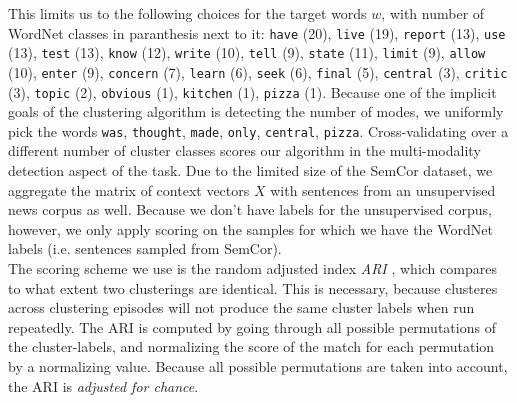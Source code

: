 \documentclass[a4paper,12pt,twoside,openright]{report}
\begin{document}
This limits us to the following choices for the target words $w$, with number of WordNet classes in paranthesis next to it: 
\Verb#have# (20), \Verb#live# (19), \Verb#report# (13), \Verb#use# (13), \Verb#test# (13), \Verb#know# (12), \Verb#write# (10), \Verb#tell# (9), \Verb#state# (11), \Verb#limit# (9), \Verb#allow# (10), \Verb#enter# (9), \Verb#concern# (7), \Verb#learn# (6), \Verb#seek# (6), \Verb#final# (5), \Verb#central# (3), \Verb#critic# (3), \Verb#topic# (2), \Verb#obvious# (1), \Verb#kitchen# (1), \Verb#pizza# (1).
Because one of the implicit goals of the clustering algorithm is detecting the number of modes, we uniformly pick the words \Verb#was#, \Verb#thought#, \Verb#made#, \Verb#only#, \Verb#central#, \Verb#pizza#.
Cross-validating over a different number of cluster classes scores our algorithm in the multi-modality detection aspect of the task.
Due to the limited size of the SemCor dataset, we aggregate the matrix of context vectors $X$ with sentences from an unsupervised news corpus as well.
Because we don't have labels for the unsupervised corpus, however, we only apply scoring on the samples for which we have the WordNet labels (i.e. sentences sampled from SemCor). \\

The scoring scheme we use is the random adjusted index \textit{ARI} \cite{rand71}, \cite{hubert85} which compares to what extent two clusterings are identical.
This is necessary, because clusteres across clustering episodes will not produce the same cluster labels when run repeatedly.
The ARI is computed by going through all possible permutations of the cluster-labels, and normalizing the score of the match for each permutation by a normalizing value.
Because all possible permutations are taken into account, the ARI is \textit{adjusted for chance}.
\end{document}

